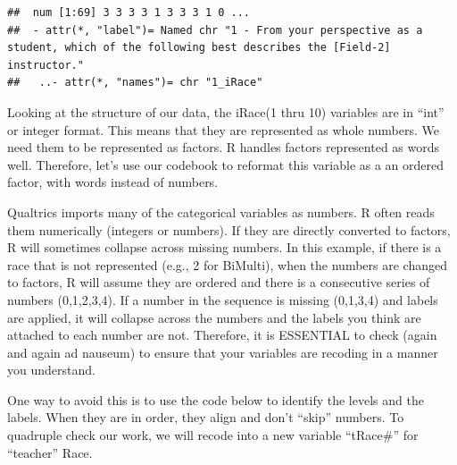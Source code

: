 \documentclass[
  11pt,
]{book}
\newenvironment{Shaded}{\begin{snugshade}}{\end{snugshade}}
\newcommand{\FunctionTok}[1]{\textcolor[rgb]{0.27,0.27,0.27}{\textbf{#1}}}
\newcommand{\NormalTok}[1]{#1}
\newcommand{\SpecialCharTok}[1]{\textcolor[rgb]{0.43,0.43,0.43}{\textbf{#1}}}
\begin{document}
\begin{Shaded}
\end{Shaded}

\begin{verbatim}
##  num [1:69] 3 3 3 3 1 3 3 3 1 0 ...
##  - attr(*, "label")= Named chr "1 - From your perspective as a student, which of the following best describes the [Field-2] instructor."
##   ..- attr(*, "names")= chr "1_iRace"
\end{verbatim}

Looking at the structure of our data, the iRace(1 thru 10) variables are in ``int'' or integer format. This means that they are represented as whole numbers. We need them to be represented as factors. R handles factors represented as words well. Therefore, let's use our codebook to reformat this variable as a an ordered factor, with words instead of numbers.

Qualtrics imports many of the categorical variables as numbers. R often reads them numerically (integers or numbers). If they are directly converted to factors, R will sometimes collapse across missing numbers. In this example, if there is a race that is not represented (e.g., 2 for BiMulti), when the numbers are changed to factors, R will assume they are ordered and there is a consecutive series of numbers (0,1,2,3,4). If a number in the sequence is missing (0,1,3,4) and labels are applied, it will collapse across the numbers and the labels you think are attached to each number are not. Therefore, it is ESSENTIAL to check (again and again ad nauseum) to ensure that your variables are recoding in a manner you understand.

One way to avoid this is to use the code below to identify the levels and the labels. When they are in order, they align and don't ``skip'' numbers. To quadruple check our work, we will recode into a new variable ``tRace\#'' for ``teacher'' Race.
\end{document}

